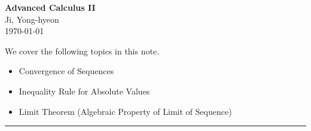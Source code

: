 \documentclass[11pt,openany]{article}
\begin{document}
\begin{center}
	\huge\textbf{Advanced Calculus II}\\
	\vspace{0.5em}
	\large{Ji, Yong-hyeon}\\
	\vspace{0.5em}
	\normalsize{\today}\\
\end{center}

\noindent 
We cover the following topics in this note.
\begin{itemize}
	\item Convergence of Sequences
	\item Inequality Rule for Absolute Values
	\item Limit Theorem (Algebraic Property of Limit of Sequence)
\end{itemize}
\hrule\vspace{12pt}
\end{document}
